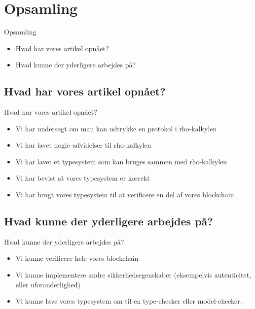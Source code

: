 \section{Opsamling}
\begin{frame}{Opsamling}
  \begin{itemize}
    \item Hvad har vores artikel opnået?
    \item Hvad kunne der yderligere arbejdes på?
  \end{itemize}
\end{frame}

\subsection{Hvad har vores artikel opnået?}
\begin{frame}{Hvad har vores artikel opnået?}
  \begin{itemize}
    \item Vi har undersøgt om man kan udtrykke en protokol i rho-kalkylen
    \item Vi har lavet nogle udvidelser til rho-kalkylen
    \item Vi har lavet et typesystem som kan bruges sammen med rho-kalkylen
    \item Vi har bevist at vores typesystem er korrekt
    \item Vi har brugt vores typesystem til at verificere en del af vores blockchain
  \end{itemize}
\end{frame}


\subsection{Hvad kunne der yderligere arbejdes på?}
\begin{frame}{Hvad kunne der yderligere arbejdes på?}
  \begin{itemize}
    \item  Vi kunne verificere hele vores blockchain
    \item Vi kunne implementere andre sikkerhedsegenskaber (eksempelvis autenticitet, eller uforanderlighed)
    \item Vi kunne lave vores typesystem om til en type-checker eller model-checker.
  \end{itemize}
\end{frame}
